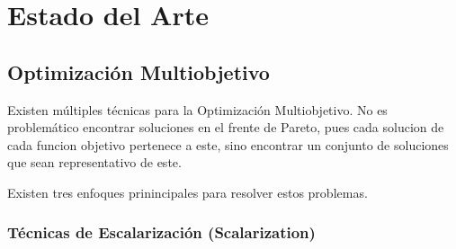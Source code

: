 \chapter{Estado del Arte}\label{chapter:state-of-the-art}

\section{Optimizaci\'on Multiobjetivo}

Existen  m\'ultiples t\'ecnicas para la Optimizaci\'on Multiobjetivo. No es problem\'atico encontrar soluciones en el frente de Pareto, pues cada solucion de cada funcion objetivo pertenece a este, sino encontrar un conjunto de soluciones que sean representativo de este.

Existen tres enfoques prinincipales para resolver estos problemas.

\subsection*{T\'ecnicas de Escalarizaci\'on (Scalarization)}

